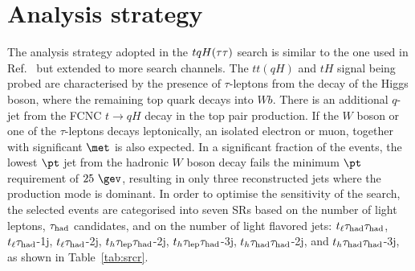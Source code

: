 \section{Analysis strategy}
\label{sec:strategy_Htautau}

The analysis strategy adopted in the $tqH(\tau\tau)$ search is similar to the one used in Ref.~\cite{fcnc36,Chen:2015nta} but extended to more search channels.
The $tt(qH)$ and $tH$ signal being probed are characterised by the presence of $\tau$-leptons from the decay of 
the Higgs boson, where the remaining top quark decays into $Wb$. There is an additional $q$-jet from the FCNC $t\to qH$ decay in the top pair production. 
If the $W$ boson or one of the $\tau$-leptons decays leptonically, an isolated electron or muon, together with significant $\met$ is also expected.
In a significant fraction of the events, the lowest $\pt$ jet from the hadronic $W$ boson decay fails the minimum $\pt$ requirement of $25~\gev$,
resulting in only three reconstructed jets where the production mode is dominant. 
In order to optimise the sensitivity of the search, the selected events are categorised into seven SRs based on the number of light leptons,
$\tau_{\mathrm{had}}$ candidates, and on the number of light flavored jets:
$t_{\ell}\tau_{\mathrm{had}} \tau_{\mathrm{had}}$, $t_{\ell}\tau_{\mathrm{had}}$-1j, $t_{\ell}\tau_{\mathrm{had}}$-2j, $t_h\tau_{\mathrm{lep}} \tau_{\mathrm{had}}$-2j, $t_h\tau_{\mathrm{lep}} \tau_{\mathrm{had}}$-3j, $t_h\tau_{\mathrm{had}} \tau_{\mathrm{had}}$-2j, and $t_h\tau_{\mathrm{had}} \tau_{\mathrm{had}}$-3j, as shown in Table~\ref{tab:srcr}. 

